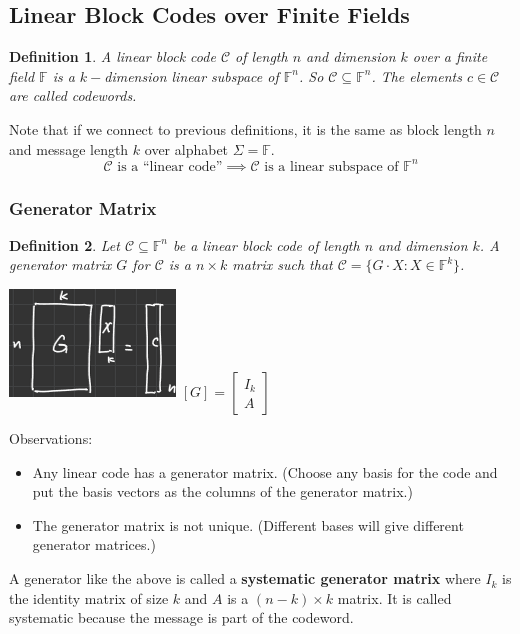 \documentclass[letterpaper,12pt]{article}
\newtheorem{definition}{Definition}
\begin{document}
\subsection{Linear Block Codes over Finite Fields}
\begin{definition}
    A linear block code $\mathcal{C}$ of length $n$ and dimension $k$ over a finite field $\mathbb{F}$ is a $k-$dimension linear subspace of $\mathbb{F}^n$. So $\mathcal{C}\subseteq \mathbb{F}^n$. The elements $c\in \mathcal{C}$ are called codewords.
\end{definition}
Note that if we connect to previous definitions, it is the same as block length $n$ and message length $k$ over alphabet $\Sigma = \mathbb{F}$.\[
    \mathcal{C} \text{ is a ``linear code''}\implies \mathcal{C} \text{ is a linear subspace of } \mathbb{F}^n
\]
\subsubsection{Generator Matrix}
\begin{definition}
    Let $\mathcal{C}\subseteq \mathbb{F}^n$ be a linear block code of length $n$ and dimension $k$. A generator matrix $G$ for $\mathcal{C}$ is a $n\times k$ matrix such that $\mathcal{C}=\{G\cdot X: X\in \mathbb{F}^k\}$.
\end{definition}
\includegraphics*{./Images/Generator Matrix.png}
$[G] =
    \begin{bmatrix}
        I_k \\
        A
    \end{bmatrix}$

Observations:\begin{itemize}
    \item Any linear code has a generator matrix. (Choose any basis for the code and put
          the basis vectors as the columns of the generator matrix.)
    \item The generator matrix is not unique. (Different bases will give different
          generator matrices.)
\end{itemize}
A generator like the above is called a \textbf{systematic generator matrix} where $I_k$ is the identity matrix of size $k$ and $A$ is a $(n-k)\times k$ matrix. It is called systematic because the message is part of the codeword.
\end{document}
